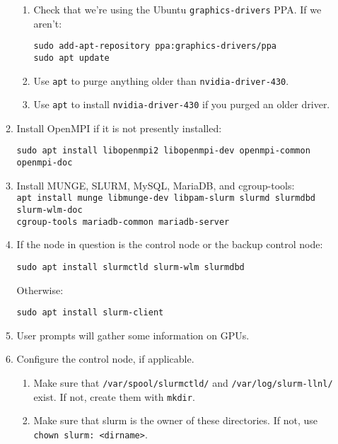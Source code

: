 \begin{enumerate}
\begin{enumerate}
		\begin{enumerate}
		\item Check that we're using the Ubuntu \texttt{graphics-drivers} PPA. If we aren't:

			\texttt{sudo add-apt-repository ppa:graphics-drivers/ppa} \\
			\texttt{sudo apt update}

		\item Use \texttt{apt} to purge anything older than \texttt{nvidia-driver-430}.

		\item Use \texttt{apt} to install \texttt{nvidia-driver-430} if you purged an older driver.

		\end{enumerate}

	\item Install OpenMPI if it is not presently installed:

		\texttt{sudo apt install libopenmpi2 libopenmpi-dev openmpi-common openmpi-doc}

	\item Install MUNGE, SLURM, MySQL, MariaDB, and cgroup-tools: \\
		\texttt{apt install munge libmunge-dev libpam-slurm slurmd slurmdbd slurm-wlm-doc \\ cgroup-tools mariadb-common mariadb-server} %

	\item If the node in question is the control node or the backup control node:

		\texttt{sudo apt install slurmctld slurm-wlm slurmdbd}

		Otherwise:

		\texttt{sudo apt install slurm-client} 

	\item User prompts will gather some information on GPUs.

	\item Configure the control node, if applicable. 

		\begin{enumerate}
		\item Make sure that \texttt{/var/spool/slurmctld/} and \texttt{/var/log/slurm-llnl/} exist. If not, create them with \texttt{mkdir}.

		\item Make sure that slurm is the owner of these directories. If not, use \texttt{chown slurm: <dirname>}.


\end{enumerate}
\end{enumerate}
\end{enumerate}
